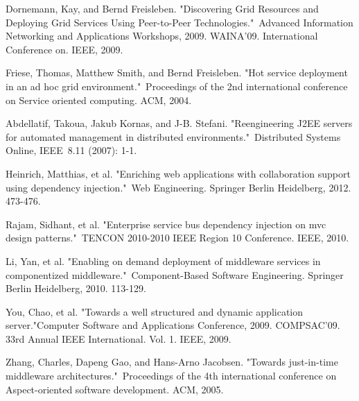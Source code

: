 \documentclass[conference]{IEEEtran}
\begin{document}
\begin{thebibliography}{9}

Dornemann, Kay, and Bernd Freisleben. "Discovering Grid Resources and Deploying Grid Services Using Peer-to-Peer Technologies." Advanced Information Networking and Applications Workshops, 2009. WAINA'09. International Conference on. IEEE, 2009.

Friese, Thomas, Matthew Smith, and Bernd Freisleben. "Hot service deployment in an ad hoc grid environment." Proceedings of the 2nd international conference on Service oriented computing. ACM, 2004.

Abdellatif, Takoua, Jakub Kornas, and J-B. Stefani. "Reengineering J2EE servers for automated management in distributed environments." Distributed Systems Online, IEEE 8.11 (2007): 1-1.

Heinrich, Matthias, et al. "Enriching web applications with collaboration support using dependency injection." Web Engineering. Springer Berlin Heidelberg, 2012. 473-476.

Rajam, Sidhant, et al. "Enterprise service bus dependency injection on mvc design patterns." TENCON 2010-2010 IEEE Region 10 Conference. IEEE, 2010.


Li, Yan, et al. "Enabling on demand deployment of middleware services in componentized middleware." Component-Based Software Engineering. Springer Berlin Heidelberg, 2010. 113-129.

You, Chao, et al. "Towards a well structured and dynamic application server."Computer Software and Applications Conference, 2009. COMPSAC'09. 33rd Annual IEEE International. Vol. 1. IEEE, 2009.

Zhang, Charles, Dapeng Gao, and Hans-Arno Jacobsen. "Towards just-in-time middleware architectures." Proceedings of the 4th international conference on Aspect-oriented software development. ACM, 2005.


\end{thebibliography}
\end{document}
